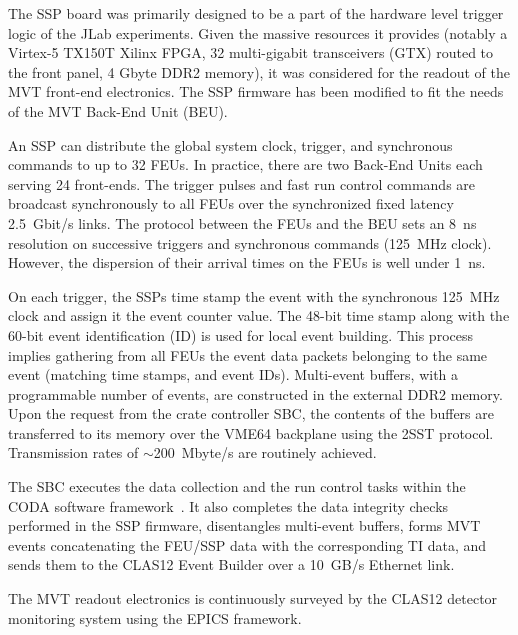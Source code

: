 The SSP board was primarily designed to be a part of the hardware level trigger logic of the JLab experiments. Given the
massive resources it provides (notably a Virtex-5 TX150T Xilinx FPGA, 32 multi-gigabit transceivers (GTX) routed to the
front panel, 4 Gbyte DDR2 memory), it was considered for the readout of the MVT front-end electronics. The SSP firmware
has been modified to fit the needs of the MVT Back-End Unit (BEU).

An SSP can distribute the global system clock, trigger, and synchronous commands to up to 32 FEUs. In practice, there are
two Back-End Units each serving 24 front-ends. The trigger pulses and fast run control commands are broadcast synchronously
to all FEUs over the synchronized fixed latency 2.5~Gbit/s links. The protocol between the FEUs and the BEU sets an 8~ns
resolution on successive triggers and synchronous commands (125~MHz clock). However, the dispersion of their arrival times
on the FEUs is well under 1~ns.

On each trigger, the SSPs time stamp the event with the synchronous 125~MHz clock and assign it the event counter value. The
48-bit time stamp along with the 60-bit event identification (ID) is used for local event building. This process implies gathering from all FEUs
the event data packets belonging to the same event (matching time stamps, and event IDs). Multi-event buffers, with a
programmable number of events, are constructed in the external DDR2 memory. Upon the request from the crate controller
SBC, the contents of the buffers are transferred to its memory over the VME64 backplane using the 2SST protocol. Transmission
rates of $\sim$200~Mbyte/s are routinely achieved.

The SBC executes the data collection and the run control tasks within the CODA software framework~\cite{daq-nim}. It 
also
completes the data integrity checks performed in the SSP firmware, disentangles multi-event buffers, forms MVT events
concatenating the FEU/SSP data with the corresponding TI data, and sends them to the CLAS12 Event Builder over a 10~GB/s
Ethernet link.

The MVT readout electronics is continuously surveyed by the CLAS12 detector monitoring system using the EPICS framework.
